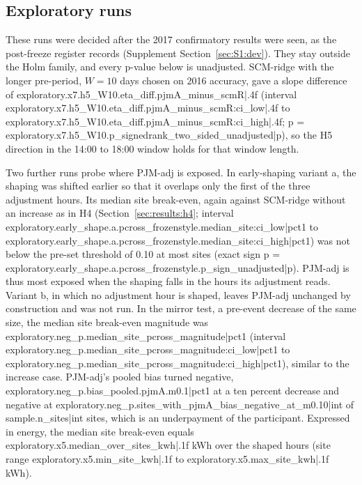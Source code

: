 \subsection{Exploratory runs}\label{sec:results:explore}

These runs were decided after the 2017 confirmatory results were seen, as the post-freeze register records (Supplement Section~\ref{sec:S1:dev}). They stay outside the Holm family, and every p-value below is unadjusted. SCM-ridge with the longer pre-period, $W=10$ days chosen on 2016 accuracy, gave a slope difference of {{exploratory.x7.h5_W10.eta_diff.pjmA_minus_scmR|.4f}} (interval {{exploratory.x7.h5_W10.eta_diff.pjmA_minus_scmR:ci_low|.4f}} to {{exploratory.x7.h5_W10.eta_diff.pjmA_minus_scmR:ci_high|.4f}}; p = {{exploratory.x7.h5_W10.p_signedrank_two_sided_unadjusted|p}}), so the H5 direction in the 14:00 to 18:00 window holds for that window length.

Two further runs probe where PJM-adj is exposed. In early-shaping variant a, the shaping was shifted earlier so that it overlaps only the first of the three adjustment hours. Its median site break-even, again against SCM-ridge without an increase as in H4 (Section~\ref{sec:results:h4}; interval {{exploratory.early_shape.a.pcross_frozenstyle.median_site:ci_low|pct1}} to {{exploratory.early_shape.a.pcross_frozenstyle.median_site:ci_high|pct1}}) was not below the pre-set threshold of 0.10 at most sites (exact sign p = {{exploratory.early_shape.a.pcross_frozenstyle.p_sign_unadjusted|p}}). PJM-adj is thus most exposed when the shaping falls in the hours its adjustment reads. Variant b, in which no adjustment hour is shaped, leaves PJM-adj unchanged by construction and was not run. In the mirror test, a pre-event decrease of the same size, the median site break-even magnitude was {{exploratory.neg_p.median_site_pcross_magnitude|pct1}} (interval {{exploratory.neg_p.median_site_pcross_magnitude:ci_low|pct1}} to {{exploratory.neg_p.median_site_pcross_magnitude:ci_high|pct1}}), similar to the increase case. PJM-adj's pooled bias turned negative, {{exploratory.neg_p.bias_pooled.pjmA.m0.1|pct1}} at a ten percent decrease and negative at {{exploratory.neg_p.sites_with_pjmA_bias_negative_at_m0.10|int}} of {{sample.n_sites|int}} sites, which is an underpayment of the participant. Expressed in energy, the median site break-even equals {{exploratory.x5.median_over_sites_kwh|.1f}} kWh over the shaped hours (site range {{exploratory.x5.min_site_kwh|.1f}} to {{exploratory.x5.max_site_kwh|.1f}} kWh).

